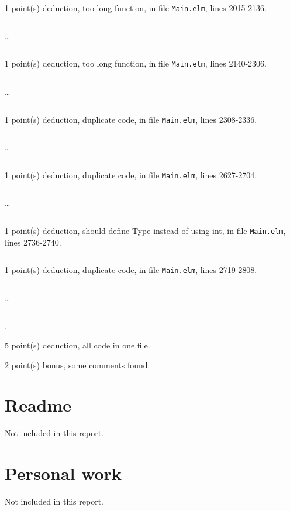 \documentclass{article}
\begin{document}
1 point(s) {\color{red}deduction}, too long function, in file {\color{blue}\texttt{Main.elm}}, lines {\color{blue}2015-2136}.

\inputminted[firstline=2015,lastline=2024]{elm}{Main.elm}

\dots

\inputminted[firstline=2127,lastline=2136]{elm}{Main.elm}

1 point(s) {\color{red}deduction}, too long function, in file {\color{blue}\texttt{Main.elm}}, lines {\color{blue}2140-2306}.

\inputminted[firstline=2140,lastline=2149]{elm}{Main.elm}

\dots

\inputminted[firstline=2297,lastline=2306]{elm}{Main.elm}

1 point(s) {\color{red}deduction}, duplicate code, in file {\color{blue}\texttt{Main.elm}}, lines {\color{blue}2308-2336}.

\inputminted[firstline=2308,lastline=2317]{elm}{Main.elm}

\dots

\inputminted[firstline=2327,lastline=2336]{elm}{Main.elm}

1 point(s) {\color{red}deduction}, duplicate code, in file {\color{blue}\texttt{Main.elm}}, lines {\color{blue}2627-2704}.

\inputminted[firstline=2627,lastline=2636]{elm}{Main.elm}

\dots

\inputminted[firstline=2695,lastline=2704]{elm}{Main.elm}

1 point(s) {\color{red}deduction}, should define Type instead of using int, in file {\color{blue}\texttt{Main.elm}}, lines {\color{blue}2736-2740}.

\inputminted[firstline=2736,lastline=2740]{elm}{Main.elm}

1 point(s) {\color{red}deduction}, duplicate code, in file {\color{blue}\texttt{Main.elm}}, lines {\color{blue}2719-2808}.

\inputminted[firstline=2719,lastline=2728]{elm}{Main.elm}

\dots

\inputminted[firstline=2799,lastline=2808]{elm}{Main.elm}

.\medskip

5 point(s) {\color{red}deduction}, all code in one file.\medskip

2 point(s) {\color{red}bonus}, some comments found.\medskip



\newpage

\section{Readme}

Not included in this report.

\section{Personal work}

Not included in this report.


\newpage
\end{document}
